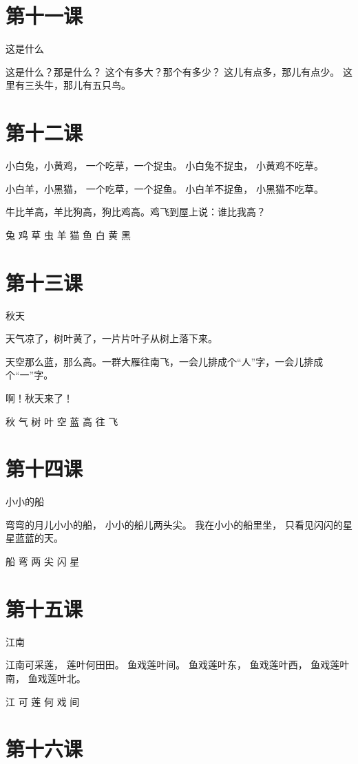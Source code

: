 \documentclass[12pt,UTF8]{ctexbook}
\begin{document}
\section{第十一课}

这是什么

这是什么？那是什么？
这个有多大？那个有多少？
这儿有点多，那儿有点少。
这里有三头牛，那儿有五只鸟。

\section{第十二课}

小白兔，小黄鸡，
一个吃草，一个捉虫。
小白兔不捉虫，
小黄鸡不吃草。

小白羊，小黑猫，
一个吃草，一个捉鱼。
小白羊不捉鱼，
小黑猫不吃草。

牛比羊高，羊比狗高，狗比鸡高。鸡飞到屋上说：谁比我高？

兔 鸡 草 虫 羊 猫 鱼 白 黄 黑

\section{第十三课}

秋天

天气凉了，树叶黄了，一片片叶子从树上落下来。

天空那么蓝，那么高。一群大雁往南飞，一会儿排成个“人”字，一会儿排成个“一”字。

啊！秋天来了！

秋 气 树 叶 空 蓝 高 往 飞

\section{第十四课}

小小的船

弯弯的月儿小小的船，
小小的船儿两头尖。
我在小小的船里坐，
只看见闪闪的星星蓝蓝的天。

船 弯 两 尖 闪 星

\section{第十五课}

江南

江南可采莲，
莲叶何田田。
鱼戏莲叶间。
鱼戏莲叶东，
鱼戏莲叶西，
鱼戏莲叶南，
鱼戏莲叶北。

江 可 莲 何 戏 间

\section{第十六课}
\end{document}
